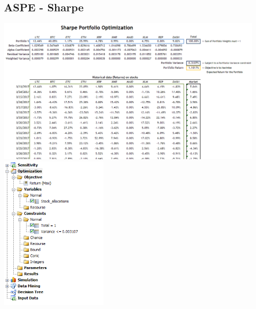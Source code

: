 \documentclass[11pt]{article} %
\begin{document}
\subsection*{ASPE - Sharpe}
\includegraphics[width=\textwidth]{aspe3}
\includegraphics[width=0.4\textwidth]{aspe4}
\end{document}
